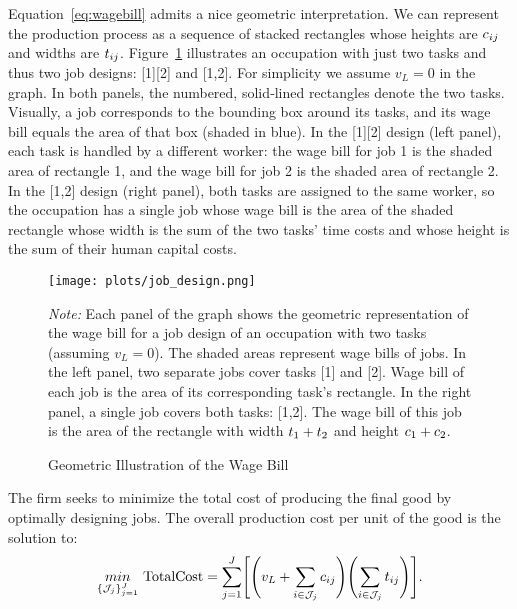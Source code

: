 \documentclass{article}
\theoremstyle{plain}
\theoremstyle{plain}
\begin{document}
Equation~\ref{eq:wagebill} admits a nice geometric interpretation.  
We can represent the production process as a sequence of stacked rectangles whose heights are $c_{ij}$ and widths are $t_{ij}$.  
Figure~\ref{fig:wage_bill} illustrates an occupation with just two tasks and thus two job designs: [1][2] and [1,2].
For simplicity we assume $v_L=0$ in the graph.
In both panels, the numbered, solid‐lined rectangles denote the two tasks.
Visually, a job corresponds to the bounding box around its tasks, and its wage bill equals the area of that box (shaded in blue).
In the [1][2] design (left panel), each task is handled by a different worker: the wage bill for job 1 is the shaded area of rectangle 1, and the wage bill for job 2 is the shaded area of rectangle 2.  
In the [1,2] design (right panel), both tasks are assigned to the same worker, so the occupation has a single job whose wage bill is the area of the shaded rectangle whose width is the sum of the two tasks’ time costs and whose height is the sum of their human capital costs.  
\begin{figure}[h]
  \caption{Geometric Illustration of the Wage Bill} 
  \label{fig:wage_bill}
  \begin{center}
    \texttt{[image: plots/job\_design.png]}
  \end{center}
  \begin{footnotesize}
    \emph{Note:} Each panel of the graph shows the geometric representation of the wage bill for a job design of an occupation with two tasks (assuming $v_L=0$).  
    The shaded areas represent wage bills of jobs. 
    In the left panel, two separate jobs cover tasks [1] and [2].
    Wage bill of each job is the area of its corresponding task's rectangle.
    In the right panel, a single job covers both tasks: [1,2].
    The wage bill of this job is the area of the rectangle with width $t_{1}+t_{2}$ and height $c_{1}+c_{2}$.
  \end{footnotesize}
\end{figure}

The firm seeks to minimize the total cost of producing the final good by optimally designing jobs.
The overall production cost per unit of the good is the solution to:
\begin{align}
\label{eq:totalcost_no_handoff}
\underset{\{\mathcal{J}_j\}_{j=1}^J}{min} \ 
\text{TotalCost} = \sum_{j=1}^J \Biggl[\Biggl(v_L + \sum_{i \in \mathcal{J}_j} \hccost{ij} \Biggr) \Biggl(\sum_{i \in \mathcal{J}_j} \timecost{ij} \Biggr)\Biggr].
\end{align}
\end{document}
